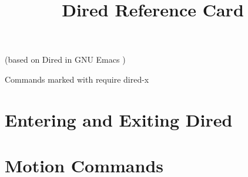 

\title{Dired Reference Card}

\centerline{(based on Dired in GNU Emacs \versionemacs)}
\centerline{Commands marked with \dx{} require dired-x}






\section{Entering and Exiting Dired}


\section{Motion Commands}

